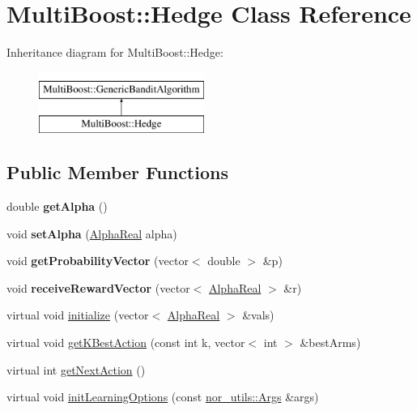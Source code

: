 \hypertarget{classMultiBoost_1_1Hedge}{\section{Multi\-Boost\-:\-:Hedge Class Reference}
\label{classMultiBoost_1_1Hedge}
}
Inheritance diagram for Multi\-Boost\-:\-:Hedge\-:\begin{figure}[H]
\begin{center}
\leavevmode
\includegraphics[height=2.000000cm]{classMultiBoost_1_1Hedge}
\end{center}
\end{figure}
\subsection*{Public Member Functions}
\begin{DoxyCompactItemize}
\item 
\hypertarget{classMultiBoost_1_1Hedge_a4cb3e7f0b8d197990a4068a42cd73ecd}{double {\bfseries get\-Alpha} ()}\label{classMultiBoost_1_1Hedge_a4cb3e7f0b8d197990a4068a42cd73ecd}

\item 
\hypertarget{classMultiBoost_1_1Hedge_a67e832dae5c15b677020a39e95756c15}{void {\bfseries set\-Alpha} (\hyperlink{Defaults_8h_a80184c4fd10ab70a1a17c5f97dcd1563}{Alpha\-Real} alpha)}\label{classMultiBoost_1_1Hedge_a67e832dae5c15b677020a39e95756c15}

\item 
\hypertarget{classMultiBoost_1_1Hedge_a00e676f4c81a242ffb182ec9bc8c98da}{void {\bfseries get\-Probability\-Vector} (vector$<$ double $>$ \&p)}\label{classMultiBoost_1_1Hedge_a00e676f4c81a242ffb182ec9bc8c98da}

\item 
\hypertarget{classMultiBoost_1_1Hedge_a843d6f226847596c4b19ded07e5fd34f}{void {\bfseries receive\-Reward\-Vector} (vector$<$ \hyperlink{Defaults_8h_a80184c4fd10ab70a1a17c5f97dcd1563}{Alpha\-Real} $>$ \&r)}\label{classMultiBoost_1_1Hedge_a843d6f226847596c4b19ded07e5fd34f}

\item 
virtual void \hyperlink{classMultiBoost_1_1Hedge_afe145603b5a8948cf8d7af6a50106b9a}{initialize} (vector$<$ \hyperlink{Defaults_8h_a80184c4fd10ab70a1a17c5f97dcd1563}{Alpha\-Real} $>$ \&vals)
\item 
virtual void \hyperlink{classMultiBoost_1_1Hedge_a3da38a7f74df23c6dc373ebc7e79a57b}{get\-K\-Best\-Action} (const int k, vector$<$ int $>$ \&best\-Arms)
\item 
virtual int \hyperlink{classMultiBoost_1_1Hedge_a0651f257320f77ceb495d3c03e5d549f}{get\-Next\-Action} ()
\item 
virtual void \hyperlink{classMultiBoost_1_1Hedge_ac16dd9e98bad81d6977a8854519c4833}{init\-Learning\-Options} (const \hyperlink{classnor__utils_1_1Args}{nor\-\_\-utils\-::\-Args} \&args)
\end{DoxyCompactItemize}
